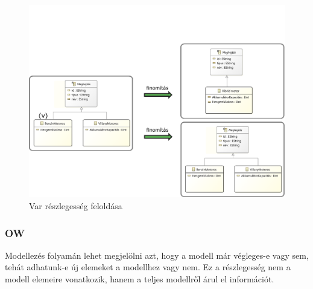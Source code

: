 \begin{figure}[htp]
	\centering
	\includegraphics[width=130mm, keepaspectratio]{figures/var.pdf}
	\caption{Var részlegesség feloldása} 
	\label{var}
\end{figure}

\subsubsection{OW}
Modellezés folyamán lehet megjelölni azt, hogy a modell már végleges-e vagy sem, tehát adhatunk-e új elemeket a modellhez vagy nem. Ez a részlegesség nem a modell elemeire vonatkozik, hanem a teljes modellről árul el információt. 
